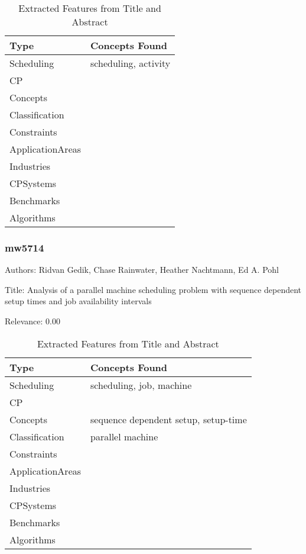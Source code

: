 {\scriptsize
\begin{longtable}{p{2cm}p{20cm}}
\caption{Extracted Features from Title and Abstract}\\ \toprule
Type & Concepts Found\\ \midrule
\endhead
\bottomrule
\endfoot
Scheduling & scheduling, activity\\ 
CP & \\ 
Concepts & \\ 
Classification & \\ 
Constraints & \\ 
ApplicationAreas & \\ 
Industries & \\ 
CPSystems & \\ 
Benchmarks & \\ 
Algorithms & \\ 
\end{longtable}
}



\subsubsection{mw5714}
\label{mw:mw5714}

Authors: Ridvan Gedik, Chase Rainwater, Heather Nachtmann, Ed A. Pohl

Title: Analysis of a parallel machine scheduling problem with sequence dependent setup times and job availability intervals

Relevance:  0.00

{\scriptsize
\begin{longtable}{p{2cm}p{20cm}}
\caption{Extracted Features from Title and Abstract}\\ \toprule
Type & Concepts Found\\ \midrule
\endhead
\bottomrule
\endfoot
Scheduling & scheduling, job, machine\\ 
CP & \\ 
Concepts & sequence dependent setup, setup-time\\ 
Classification & parallel machine\\ 
Constraints & \\ 
ApplicationAreas & \\ 
Industries & \\ 
CPSystems & \\ 
Benchmarks & \\ 
Algorithms & \\ 
\end{longtable}
}




